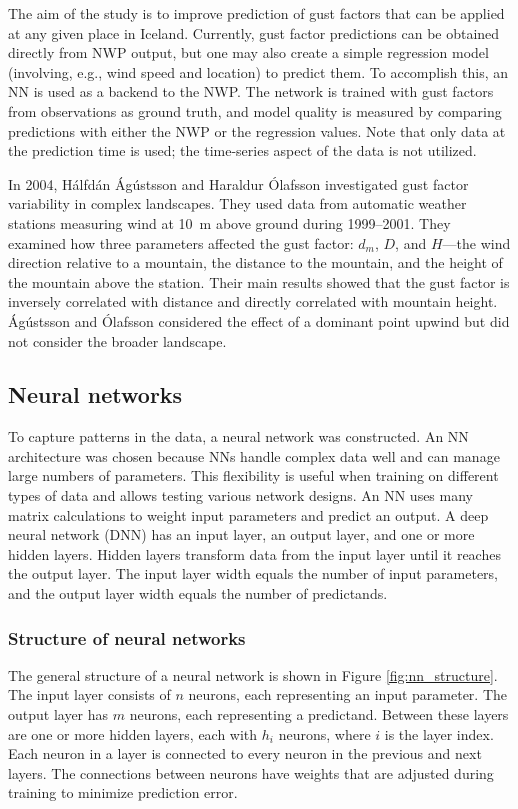 The aim of the study is to improve prediction of gust factors that can be applied at any given place in Iceland. Currently, gust factor predictions can be obtained directly from NWP output, but one may also create a simple regression model (involving, e.g., wind speed and location) to predict them. To accomplish this, an NN is used as a backend to the NWP. The network is trained with gust factors from observations as ground truth, and model quality is measured by comparing predictions with either the NWP or the regression values. Note that only data at the prediction time is used; the time-series aspect of the data is not utilized.

In 2004, Hálfdán Ágústsson and Haraldur Ólafsson \cite{mean_gust_HA_HO} investigated gust factor variability in complex landscapes. They used data from automatic weather stations measuring wind at 10~m above ground during 1999–2001. They examined how three parameters affected the gust factor: \(d_m\), \(D\), and \(H\)—the wind direction relative to a mountain, the distance to the mountain, and the height of the mountain above the station. Their main results showed that the gust factor is inversely correlated with distance and directly correlated with mountain height. Ágústsson and Ólafsson considered the effect of a dominant point upwind but did not consider the broader landscape.

\subsection{Neural networks}
To capture patterns in the data, a neural network was constructed. An NN architecture was chosen because NNs handle complex data well and can manage large numbers of parameters. This flexibility is useful when training on different types of data and allows testing various network designs. An NN uses many matrix calculations to weight input parameters and predict an output. A deep neural network (DNN) has an input layer, an output layer, and one or more hidden layers. Hidden layers transform data from the input layer until it reaches the output layer. The input layer width equals the number of input parameters, and the output layer width equals the number of predictands.

\subsubsection{Structure of neural networks}
The general structure of a neural network is shown in Figure \ref{fig:nn_structure}. The input layer consists of $n$ neurons, each representing an input parameter. The output layer has $m$ neurons, each representing a predictand. Between these layers are one or more hidden layers, each with $h_i$ neurons, where $i$ is the layer index. Each neuron in a layer is connected to every neuron in the previous and next layers. The connections between neurons have weights that are adjusted during training to minimize prediction error.

